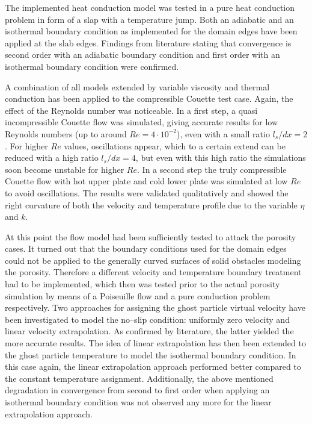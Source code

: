\documentclass[11pt,a4paper,twoside]{report}
\begin{document}
The implemented heat conduction model was tested in a pure heat conduction problem in form of a slap with a temperature jump. Both an adiabatic and an isothermal boundary condition as implemented for the domain edges have been applied at the slab edges.
Findings from literature stating that convergence is second order with an adiabatic boundary condition and first order with an isothermal boundary condition were confirmed.

A combination of all models extended by variable viscosity and thermal conduction has been applied to the compressible Couette test case. Again, the effect of the Reynolds number was noticeable. In a first step, a quasi incompressible Couette flow was simulated, giving accurate results for low Reynolds numbers (up to around $Re=4\cdot10^{-2}$), even with a small ratio $l_s/dx=2$. For higher $Re$ values, oscillations appear, which to a certain extend can be reduced with a high ratio $l_s/dx=4$, but even with this high ratio the simulations soon become unstable for higher $Re$. In a second step the truly compressible Couette flow with hot upper plate and cold lower plate was simulated at low $Re$ to avoid oscillations. The results were validated qualitatively and showed the right curvature of both the velocity and temperature profile due to the variable $\eta$ and $k$.

At this point the flow model had been sufficiently tested to attack the porosity cases. It turned out that the boundary conditions used for the domain edges could not be applied to the generally curved surfaces of solid obstacles modeling the porosity. Therefore a different velocity and temperature boundary treatment had to be implemented,  which then was tested prior to the actual porosity simulation by means of a Poiseuille flow and a pure conduction problem respectively. Two approaches for assigning the ghost particle virtual velocity have been investigated to model the no--slip condition: uniformly zero velocity and linear velocity extrapolation. As confirmed by literature, the latter yielded the more accurate results. The idea of linear extrapolation has then been extended to the ghost particle temperature to model the isothermal boundary condition. In this case again, the linear extrapolation approach performed better compared to the constant temperature assignment. Additionally, the above mentioned degradation in convergence from second to first order when applying an isothermal boundary condition was not observed any more for the linear extrapolation approach.
\end{document}
